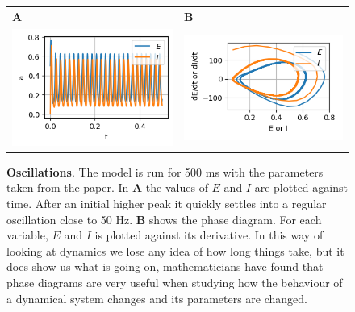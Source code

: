 \documentclass[11pt,a4paper]{scrartcl}
\begin{document}
\begin{figure}
  \begin{center}
    \begin{tabular}{ll}
      \textbf{A}&\textbf{B}\\
  \includegraphics{pi.png}&  \includegraphics{phase.png}
\end{tabular}
    \end{center}
  \caption{\textbf{Oscillations}. The model is run for 500 ms with the
    parameters taken from the paper. In \textbf{A} the values of $E$
    and $I$ are plotted against time. After an initial higher peak it
    quickly settles into a regular oscillation close to 50 Hz.
    \textbf{B} shows the phase diagram. For each variable, $E$ and $I$
    is plotted against its derivative. In this way of looking at
    dynamics we lose any idea of how long things take, but it does
    show us what is going on, mathematicians have found that phase
    diagrams are very useful when studying how the behaviour of a
    dynamical system changes and its parameters are changed.}
  \label{fig:pi}
\end{figure}
\end{document}
